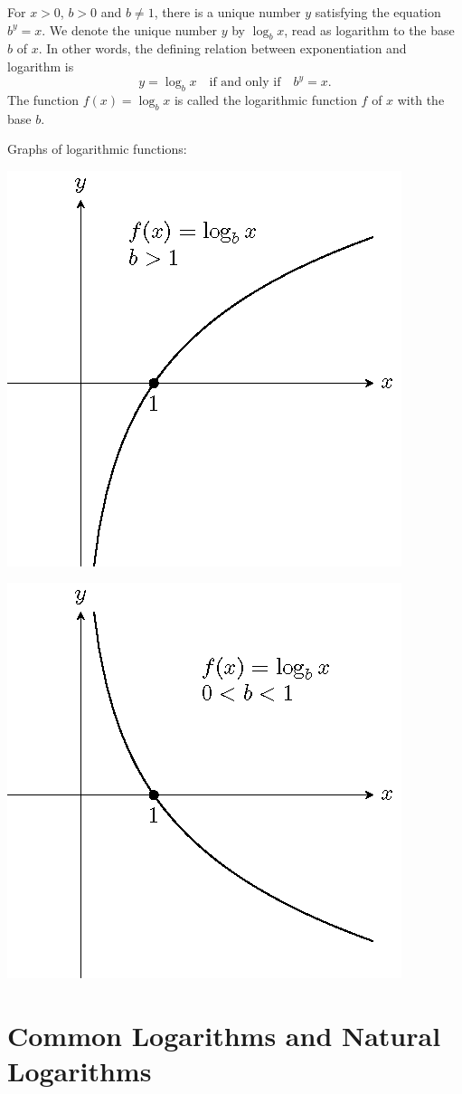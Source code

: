 \documentclass[en,12pt]{elegantbook}
\begin{document}
For \(x>0\), \(b>0\) and \(b\neq 1\), there is a unique number \(y\) satisfying the equation \(b^y=x\). We denote the unique number \(y\) by \(\log_bx\), read as logarithm to the base \(b\) of \(x\). In other words, the defining relation between exponentiation and logarithm is
\[
y=\log_bx \quad\text{if and only if} \quad b^y=x.
\]
The function \(f(x)=\log_bx\) is called the logarithmic function \(f\) of \(x\) with the base \(b\).

Graphs of logarithmic functions:

\begin{multicols}{2}

\begin{center}\includegraphics[width=0.5\linewidth]{figs/tikz-example-log-function-graph-1} \end{center}

\begin{center}\includegraphics[width=0.5\linewidth]{figs/tikz-example-log-function-graph-2} \end{center}

\end{multicols}

\hypertarget{common-logarithms-and-natural-logarithms}{%
\section{Common Logarithms and Natural Logarithms}\label{common-logarithms-and-natural-logarithms}}
\end{document}
